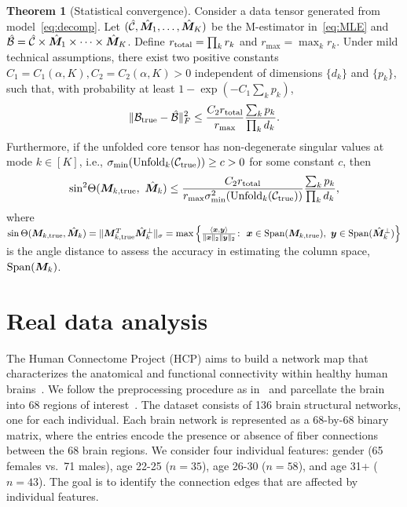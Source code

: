 \documentclass{article}
\theoremstyle{definition}
\newtheorem{thm}{Theorem}[section]
\theoremstyle{definition}
\begin{document}
 
\begin{thm}[Statistical convergence]\label{thm:main}
Consider a data tensor generated from model~\eqref{eq:decomp}. Let $(\hat {\mathcal{C}}, \hat {\bm M}_1,\ldots,\hat {\bm M}_K)$ be the M-estimator in~\eqref{eq:MLE} and $\hat {\mathcal{B}}=\hat {\mathcal{C}}\times \hat {\bm M}_1\times\cdots \times \hat {\bm M}_K$. Define $r_\textup{total}=\prod_k r_k$ and $r_{\max}=\max_k r_k$. Under mild technical assumptions, there exist two positive constants $C_1=C_1(\alpha,K), C_2=C_2(\alpha, K)>0$ independent of dimensions $\{d_k\}$ and $\{p_k\}$, such that, with probability at least $1-\exp(-C_1\sum_k p_k)$, 
\begin{equation}\label{eq:bound}
    \lVert\mathcal{B}_{\textup{true}}- \hat {\mathcal{B}}\rVert_F^2\leq \frac{ C_{2} r_{\textup{total}}}{r_{\max}}\frac{\sum_k p_k}{\prod_k d_k}.
\end{equation}
Furthermore, if the unfolded core tensor has non-degenerate singular values at mode $k\in[K]$, i.e., $\sigma_{\min}(\textup{Unfold}_k(\mathcal{C}_\textup{true})) \geq c>0$ for some constant $c$, then
\begin{equation}\label{eq:sinebound}
\textup{sin}^2 \Theta(\bm M_{k,\textup{true}},\ \hat {\bm M}_k) \leq  \frac{ C_{2}r_{\textup{total}}}{ r_{\max}\sigma^2_{\min}(\textup{Unfold}_k(\mathcal{C}_\textup{true}))}\frac{\sum_k p_k}{\prod_k d_k},
\end{equation}
where $
\sin \Theta(\bm M_{k,\textup{true}},\hat {\bm M}_k)=\lVert\bm M_{k,\textup{true}}^T \hat {\bm M}_k^{\perp}\rVert_\sigma=\max\left\{ \frac{\langle \bm x, \bm{y}\rangle}{\lVert\bm x\rVert_2\lVert\bm{y}\rVert_2}\colon \ \bm x\in \textup{Span}(\bm M_{k,\textup{true}}),\ \bm{y}\in \textup{Span}({\hat {\bm M}_k}^\perp)\right\}
$ is the angle distance to assess the accuracy in estimating the column space, $\textup{Span}(\bm M_k)$.
\end{thm}

\section{Real data analysis}

The Human Connectome Project (HCP) aims to build a network map that characterizes the anatomical and functional connectivity within healthy human brains~\citep{HCP}. 
We follow the preprocessing procedure as in~\cite{zhang2018mapping} and parcellate the brain into 68 regions of interest~\citep{desikan2006automated}. The dataset consists of 136 brain structural networks, one for each individual. Each brain network is represented as a 68-by-68 binary matrix, where the entries encode the presence or absence of fiber connections between the 68 brain regions. We consider four individual features: gender (65 females vs.\ 71 males), age 22-25 ($n=35$), age 26-30 ($n=58$), and age 31+ ($n=43$). The goal is to identify the connection edges that are affected by individual features. 
\end{document}

